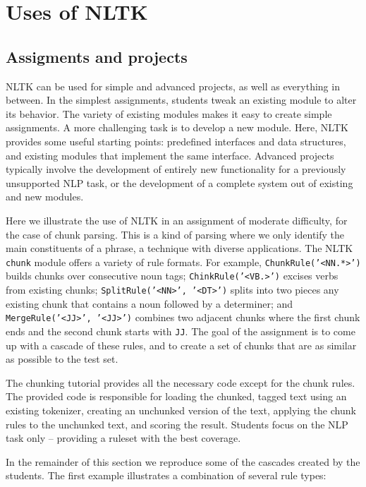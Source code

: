 \documentclass[11pt]{article}
\begin{document}
\section{Uses of NLTK}

\subsection{Assigments and projects}

NLTK can be used for simple and advanced projects, as well as
everything in between.  In the simplest assignments, students tweak an
existing module to alter its behavior.  The variety of existing
modules makes it easy to create simple assignments.  A more
challenging task is to develop a new module.  Here, NLTK provides some
useful starting points: predefined interfaces and data structures, and
existing modules that implement the same interface.  Advanced projects
typically involve the development of entirely new functionality for a
previously unsupported NLP task, or the development of a complete
system out of existing and new modules.

Here we illustrate the use of NLTK in an assignment of moderate
difficulty, for the case of chunk parsing.  This is a kind of parsing
where we only identify the main constituents of a phrase, a technique
with diverse applications.  The NLTK \texttt{chunk} module offers
a variety of rule formats.  For example,
\texttt{ChunkRule('<NN.*>')} builds chunks over consecutive noun tags;
\texttt{ChinkRule('<VB.>')} excises verbs from existing chunks;
\texttt{SplitRule('<NN>', '<DT>')} splits into two pieces any existing
chunk that contains a noun followed by a determiner; and
\texttt{MergeRule('<JJ>', '<JJ>')} combines two adjacent chunks
where the first chunk ends and the second chunk starts with \texttt{JJ}.
The goal of the assignment is to come up with a cascade of these rules,
and to create a set of chunks that are as similar as possible to the test set.

The chunking tutorial provides all the necessary code except for the
chunk rules.  The provided code is responsible for loading the
chunked, tagged text using an existing tokenizer, creating an
unchunked version of the text, applying the chunk rules to the
unchunked text, and scoring the result.  Students focus on the
NLP task only -- providing a ruleset with the best coverage.

In the remainder of this section we reproduce some of the cascades
created by the students.  The first example illustrates a combination
of several rule types:
\end{document}
